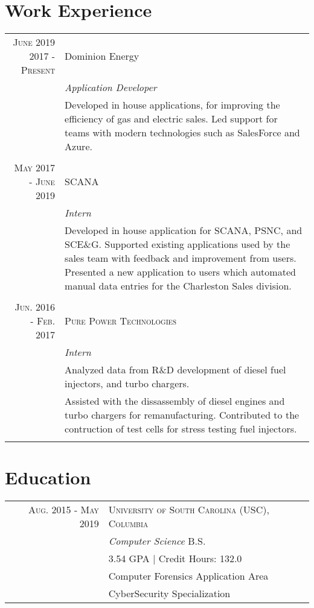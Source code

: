 \documentclass[a4paper,10pt]{article}
\begin{document}
\section{Work Experience}
\begin{tabular}{r|p{11cm}}
 \textsc{June 2019 2017 - Present} & Dominion Energy
 \\&\emph{Application Developer}\\
 &\footnotesize{Developed in house applications, for improving the efficiency of gas and electric sales. Led support for teams with modern technologies such as SalesForce and Azure. }\\\multicolumn{2}{c}{} \\

 \textsc{May 2017 - June 2019} & SCANA
 \\&\emph{Intern}\\
 &\footnotesize{Developed in house application for SCANA, PSNC, and SCE\&G. Supported existing applications used by the sales team with feedback and improvement from users. Presented a new application to users which automated manual data entries for the Charleston Sales division. }\\\multicolumn{2}{c}{} \\
 

 \textsc{Jun. 2016 - Feb. 2017} & \textsc{Pure Power Technologies} 
 \\&\emph{Intern}\\&\footnotesize{Analyzed data from R\&D development of diesel fuel injectors, and turbo chargers.} \\ & \footnotesize{Assisted with the dissassembly of diesel engines and turbo chargers for remanufacturing. Contributed to the contruction of test cells for stress testing fuel injectors.}\\\multicolumn{2}{c}{} 
\end{tabular}

\section{Education}
\begin{tabular}{r|l}	
\textsc{Aug. 2015 - May 2019     }    & \textsc{University of South Carolina (USC), Columbia}\\ &\emph{Computer Science} B.S. \\
& \footnotesize{3.54 GPA | Credit Hours: 132.0 }\\
& \footnotesize{Computer Forensics Application Area } \\
& \footnotesize{CyberSecurity Specialization}
\end{tabular}
\end{document}
